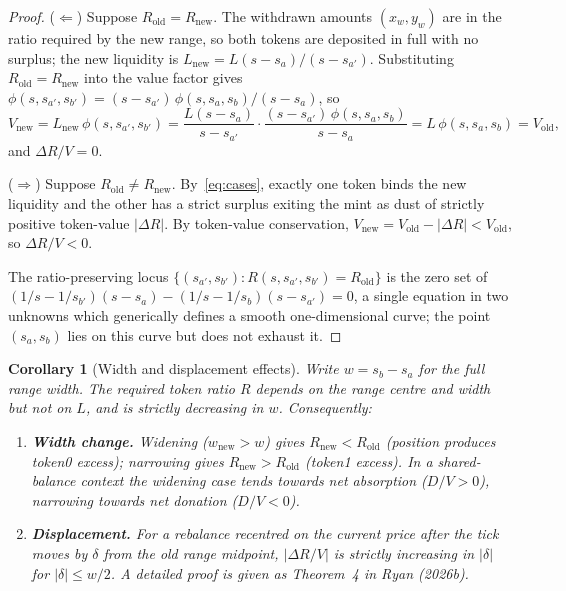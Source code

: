 \documentclass[11pt,a4paper]{article}
\newtheorem*{corollary}{Corollary}
\begin{document}
\begin{proof}
($\Leftarrow$) Suppose $R_{\text{old}} = R_{\text{new}}$. The withdrawn amounts $(x_w, y_w)$ are in the ratio required by the new range, so both tokens are deposited in full with no surplus; the new liquidity is $L_{\text{new}} = L(s - s_a)/(s - s_{a'})$. Substituting $R_{\text{old}} = R_{\text{new}}$ into the value factor gives $\phi(s, s_{a'}, s_{b'}) = (s - s_{a'})\,\phi(s, s_a, s_b)/(s - s_a)$, so
\[
V_{\text{new}} = L_{\text{new}}\,\phi(s, s_{a'}, s_{b'}) = \frac{L(s - s_a)}{s - s_{a'}} \cdot \frac{(s - s_{a'})\,\phi(s, s_a, s_b)}{s - s_a} = L\,\phi(s, s_a, s_b) = V_{\text{old}},
\]
and $\Delta R/V = 0$.

($\Rightarrow$) Suppose $R_{\text{old}} \neq R_{\text{new}}$. By~\eqref{eq:cases}, exactly one token binds the new liquidity and the other has a strict surplus exiting the mint as dust of strictly positive token-value $|\Delta R|$. By token-value conservation, $V_{\text{new}} = V_{\text{old}} - |\Delta R| < V_{\text{old}}$, so $\Delta R/V < 0$.

The ratio-preserving locus $\{(s_{a'}, s_{b'}) : R(s, s_{a'}, s_{b'}) = R_{\text{old}}\}$ is the zero set of $(1/s - 1/s_{b'})(s - s_a) - (1/s - 1/s_b)(s - s_{a'}) = 0$, a single equation in two unknowns which generically defines a smooth one-dimensional curve; the point $(s_a, s_b)$ lies on this curve but does not exhaust it.
\end{proof}

\begin{corollary}[Width and displacement effects]
Write $w = s_b - s_a$ for the full range width. The required token ratio $R$ depends on the range centre and width but not on $L$, and is strictly decreasing in $w$. Consequently:
\begin{enumerate}[label=(\roman*),leftmargin=*]
    \item \textbf{Width change.} Widening ($w_{\text{new}} > w$) gives $R_{\text{new}} < R_{\text{old}}$ (position produces token0 excess); narrowing gives $R_{\text{new}} > R_{\text{old}}$ (token1 excess). In a shared-balance context the widening case tends towards net absorption ($D/V > 0$), narrowing towards net donation ($D/V < 0$).
    \item \textbf{Displacement.} For a rebalance recentred on the current price after the tick moves by $\delta$ from the old range midpoint, $|\Delta R/V|$ is strictly increasing in $|\delta|$ for $|\delta| \leq w/2$. A detailed proof is given as Theorem~4 in Ryan (2026b).
\end{enumerate}
\end{corollary}
\end{document}
